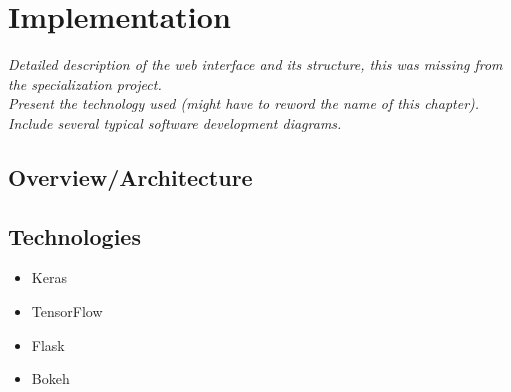 
\chapter{Implementation}

\textit{Detailed description of the web interface and its structure, this was missing from the specialization project. \\
\noindent Present the technology used (might have to reword the name of this chapter). \\
\noindent Include several typical software development diagrams.}

\section{Overview/Architecture}

\section{Technologies}

\begin{itemize}
    \item Keras
    \item TensorFlow
    \item Flask
    \item Bokeh
\end{itemize}

\cleardoublepage